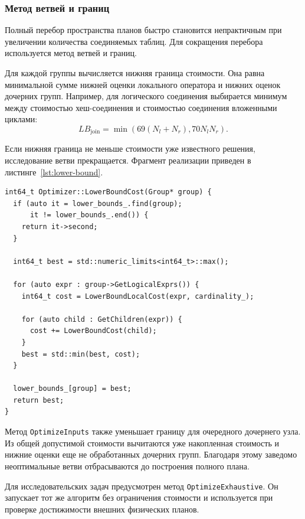 \documentclass[fontsize=14pt, russian]{scrartcl}
\begin{document}
\subsubsection{Метод ветвей и границ}

Полный перебор пространства планов быстро становится непрактичным при
увеличении количества соединяемых таблиц. Для сокращения перебора используется
метод ветвей и границ.

Для каждой группы вычисляется нижняя граница стоимости. Она равна минимальной
сумме нижней оценки локального оператора и нижних оценок дочерних групп.
Например, для логического соединения выбирается минимум между стоимостью
хеш-соединения и стоимостью соединения вложенными циклами:
\[
  LB_{\text{join}} =
  \min(69(N_l + N_r), 70N_lN_r).
\]

Если нижняя граница не меньше стоимости уже известного решения, исследование
ветви прекращается. Фрагмент реализации приведен в
листинге~\ref{lst:lower-bound}.

\begin{listing}[H]
  \caption{Вычисление нижней границы стоимости группы.}
  \label{lst:lower-bound}
  \begin{verbatim}
int64_t Optimizer::LowerBoundCost(Group* group) {
  if (auto it = lower_bounds_.find(group);
      it != lower_bounds_.end()) {
    return it->second;
  }

  int64_t best = std::numeric_limits<int64_t>::max();

  for (auto expr : group->GetLogicalExprs()) {
    int64_t cost = LowerBoundLocalCost(expr, cardinality_);

    for (auto child : GetChildren(expr)) {
      cost += LowerBoundCost(child);
    }
    best = std::min(best, cost);
  }

  lower_bounds_[group] = best;
  return best;
}
  \end{verbatim}
\end{listing}

Метод \verb|OptimizeInputs| также уменьшает границу для очередного дочернего
узла. Из общей допустимой стоимости вычитаются уже накопленная стоимость и
нижние оценки еще не обработанных дочерних групп. Благодаря этому заведомо
неоптимальные ветви отбрасываются до построения полного плана.

Для исследовательских задач предусмотрен метод \verb|OptimizeExhaustive|. Он
запускает тот же алгоритм без ограничения стоимости и используется при
проверке достижимости внешних физических планов.
\end{document}
